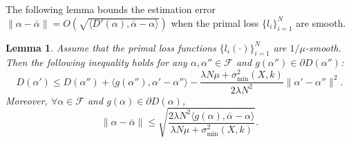 \documentclass[11pt]{article}
\newtheorem{lemma}{Lemma}
\numberwithin{equation}{section}
\numberwithin{table}{section}
\numberwithin{figure}{section}
\begin{document}
The following lemma bounds the estimation error $\|\alpha - \bar\alpha\|=O(\sqrt{\langle D'(\alpha), \bar\alpha - \alpha\rangle})$ when the primal loss $\{l_i\}_{i=1}^N$ are smooth.
\begin{lemma}\label{lemma:strong_concavity}
Assume that the primal loss functions $\{l_i(\cdot)\}_{i=1}^N$ are $1/\mu$-smooth. Then the following inequality holds for any $\alpha, \alpha'' \in \mathcal{F}$ and $g(\alpha'') \in \partial D(\alpha'')$:
\[
D(\alpha') \le D(\alpha'') + \langle g(\alpha'') , \alpha' - \alpha'' \rangle - \frac{\lambda N \mu+\sigma^2_{\min}(X,k)}{2\lambda N^2} \|\alpha' - \alpha''\|^2.
\]
Moreover, $\forall \alpha \in \mathcal{F}$ and $g(\alpha)\in \partial D(\alpha)$,
\[
\|\alpha - \bar\alpha\| \le \sqrt{\frac{2\lambda N^2\langle g(\alpha), \bar\alpha - \alpha\rangle}{\lambda N \mu+\sigma^2_{\min}(X,k)}}.
\]
\end{lemma}
\end{document}
